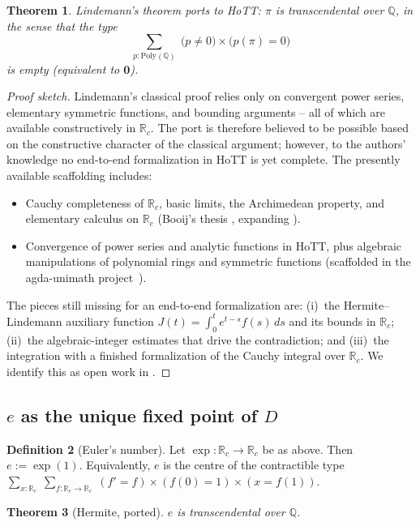 \documentclass[12pt]{article}
\newtheorem{theorem}{Theorem}[section]
\theoremstyle{definition}
\newtheorem{definition}[theorem]{Definition}
\theoremstyle{remark}
\newcommand{\R}{\mathbb{R}}
\newcommand{\Q}{\mathbb{Q}}
\begin{document}
\begin{theorem}
\label{thm:pi-trans}
Lindemann's theorem ports to HoTT: $\pi$ is transcendental over $\Q$, in
the sense that the type
\[
\sum_{p : \mathrm{Poly}(\Q)}\;\bigl(p \neq 0\bigr) \times
\bigl(p(\pi) = 0\bigr)
\]
is empty (equivalent to $\mathbf{0}$).
\end{theorem}

\begin{proof}[Proof sketch]
Lindemann's classical proof relies only on convergent power series,
elementary symmetric functions, and bounding arguments -- all of which
are available constructively in $\R_c$. The port is therefore believed
to be possible based on the constructive character of the classical
argument; however, to the authors' knowledge no end-to-end formalization
in HoTT is yet complete. The presently available scaffolding includes:
\begin{itemize}
\item Cauchy completeness of $\R_c$, basic limits, the Archimedean
property, and elementary calculus on $\R_c$ (Booij's thesis
\cite{Booij}, expanding \cite[\S11.3]{HoTTBook}).
\item Convergence of power series and analytic functions in HoTT, plus
algebraic manipulations of polynomial rings and symmetric functions
(scaffolded in the agda-unimath project~\cite{AgdaUnimath}).
\end{itemize}
The pieces still missing for an end-to-end formalization are: (i)~the
Hermite--Lindemann auxiliary function $J(t) = \int_0^t e^{t - s}
f(s)\,ds$ and its bounds in $\R_c$; (ii)~the algebraic-integer estimates
that drive the contradiction; and (iii)~the integration with a finished
formalization of the Cauchy integral over $\R_c$. We identify this as
open work in .
\end{proof}

\subsection{$e$ as the unique fixed point of $D$}

\begin{definition}[Euler's number]
\label{def:e}
Let $\exp : \R_c \to \R_c$ be as above. Then $e := \exp(1)$. Equivalently,
$e$ is the centre of the contractible type
$\sum_{x : \R_c}\;\sum_{f : \R_c \to \R_c}\;
(f' = f) \times (f(0) = 1) \times (x = f(1))$.
\end{definition}

\begin{theorem}[Hermite, ported]
\label{thm:e-trans}
$e$ is transcendental over $\Q$.
\end{theorem}
\end{document}
